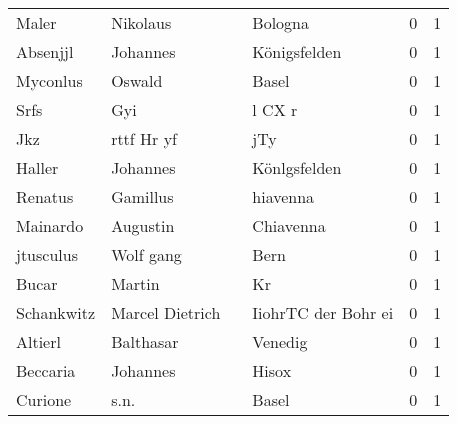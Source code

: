 \begin{tabular}{llllrr}
                    Maler &                           Nikolaus &             &                                     Bologna &          0 &         1 \\
                 Absenjjl &                           Johannes &             &                                Königsfelden &          0 &         1 \\
                 Myconlus &                             Oswald &             &                                       Basel &          0 &         1 \\
                     Srfs &                                Gyi &             &                                      l CX r &          0 &         1 \\
                      Jkz &                         rttf Hr yf &             &                                         jTy &          0 &         1 \\
                   Haller &                           Johannes &             &                                Könlgsfelden &          0 &         1 \\
                  Renatus &                           Gamillus &             &                                    hiavenna &          0 &         1 \\
                 Mainardo &                           Augustin &             &                                   Chiavenna &          0 &         1 \\
                jtusculus &                          Wolf gang &             &                                        Bern &          0 &         1 \\
                    Bucar &                             Martin &             &                                          Kr &          0 &         1 \\
               Schankwitz &                    Marcel Dietrich &             &                         IiohrTC der Bohr ei &          0 &         1 \\
                  Altierl &                          Balthasar &             &                                     Venedig &          0 &         1 \\
                 Beccaria &                           Johannes &             &                                       Hisox &          0 &         1 \\
                  Curione &                               s.n. &             &                                       Basel &          0 &         1 \\

\end{tabular}
